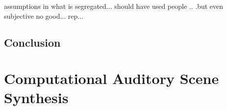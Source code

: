 \documentclass[a4paper,10pt,final]{ThesisStyle}
\begin{document}
assumptions in what is segregated... should have used people .. .but even subjective no good... rep...


\section{Conclusion}









\chapter{Computational Auditory Scene Synthesis}
\label{ch:synthesis-audio}
\minitoc


\end{document}
